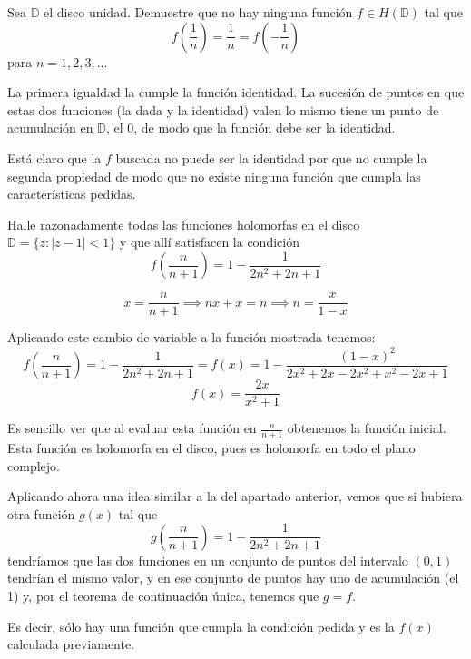 \begin{problem}[1]
Sea $\mathbb{D}$ el disco unidad. Demuestre que no hay ninguna función $f \in H(\mathbb{D})$ tal que
\[f \left( \frac{1}{n}\right) = \frac{1}{n} = f\left( -\frac{1}{n} \right)\]
para $n=1,2,3,...$

\solution
La primera igualdad la cumple la función identidad. La sucesión de puntos en que estas dos funciones (la dada y la identidad) valen lo mismo tiene un punto de acumulación en $\mathbb{D}$, el 0, de modo que la función debe ser la identidad.

Está claro que la $f$ buscada no puede ser la identidad por que no cumple la segunda propiedad de modo que no existe ninguna función que cumpla las características pedidas.

\end{problem}

\begin{problem}[2]
Halle razonadamente todas las funciones holomorfas en el disco $\mathbb{D}=\{z : |z-1|<1\}$ y que allí satisfacen la condición
\[f \left( \frac{n}{n+1}\right) = 1-\frac{1}{2n^2+2n+1}\]

\solution
{}

\[x=\frac{n}{n+1} \implies nx+x=n\implies n = \frac{x}{1-x}\]

Aplicando este cambio de variable a la función mostrada tenemos:
\[f\left(\frac{n}{n+1}\right) = 1-\frac{1}{2n^2+2n+1}= f(x)=1-\frac{(1-x)^2}{2x^2+2x-2x^2+x^2-2x+1}\]
\[f(x)=\frac{2x}{x^2+1}\]

Es sencillo ver que al evaluar esta función en $\frac{n}{n+1}$ obtenemos la función inicial. Esta función es holomorfa en el disco, pues es holomorfa en todo el plano complejo.

Aplicando ahora una idea similar a la del apartado anterior, vemos que si hubiera otra función $g(x)$ tal que
\[g\left( \frac{n}{n+1}\right) = 1-\frac{1}{2n^2+2n+1}\]
tendríamos que las dos funciones en un conjunto de puntos del intervalo $(0,1)$ tendrían el mismo valor, y en ese conjunto de puntos hay uno de acumulación (el 1) y, por el teorema de continuación única, tenemos que $g=f$.

Es decir, sólo hay una función que cumpla la condición pedida y es la $f(x)$ calculada previamente.

\end{problem}

